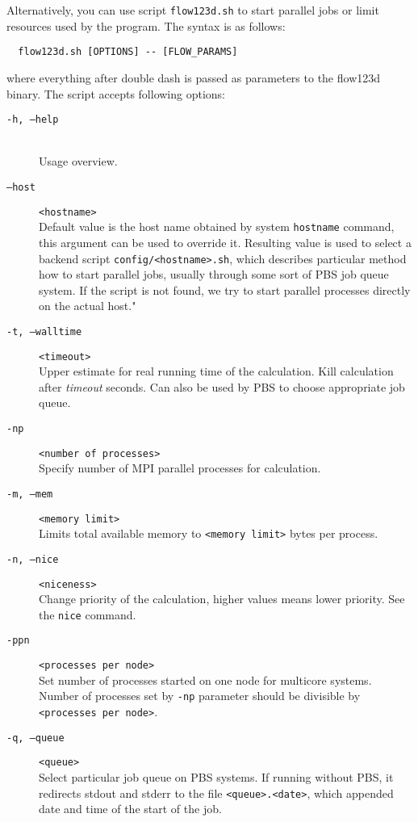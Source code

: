 \documentclass[12pt,a4paper]{report}
\begin{document}
Alternatively, you can use script \verb'flow123d.sh' to start parallel jobs or limit resources used by the program. 
The syntax is as follows:

\begin{verbatim}
  flow123d.sh [OPTIONS] -- [FLOW_PARAMS]
\end{verbatim}
where everything after double dash is passed as parameters to the flow123d binary. The script accepts following options:

\begin{description}
  \item[{\tt -h, --help}] \hfill\\
  	Usage overview.
  \item[{\tt --host}] \verb'<hostname>' \hfill\\
        Default value is the host name obtained by system \verb'hostname' command, this argument can be used to override it. 
        Resulting value is used to select a backend script \verb'config/<hostname>.sh', which describes particular method how to start 
        parallel jobs, usually through some sort of PBS job queue system. If the script is not found, we try to start parallel processes 
        directly on the actual host."
  \item[{\tt -t, --walltime}] \verb'<timeout>' \hfill\\
  	Upper estimate for real running time of the calculation. Kill calculation after {\it timeout} seconds. 
  	Can also be used by PBS to choose appropriate job queue. 
  \item[{\tt -np}] \verb'<number of processes>' \hfill\\
  	Specify number of MPI parallel processes for calculation.
  \item[{\tt -m, --mem}] \verb'<memory limit>' \hfill\\
  	Limits total available memory to \verb'<memory limit>' bytes per process.
  \item[{\tt -n, --nice}] \verb'<niceness>' \hfill\\
  	Change priority of the calculation, higher values means lower priority. See the {\tt nice} command.
  \item[{\tt -ppn}] \verb'<processes per node>' \hfill\\
       Set number of processes started on one node for multicore systems. 
       Number of processes set by \verb'-np' parameter should be divisible by \verb'<processes per node>'.
  \item[{\tt -q, --queue}] \verb'<queue>' \hfill\\
       Select particular job queue on PBS systems. If running without PBS, 
       it redirects stdout and stderr to the file \verb'<queue>.<date>', which appended date and time of the start of the job.
\end{description}
\end{document}
